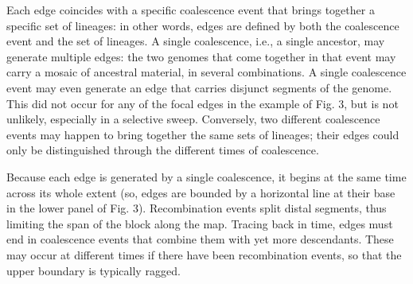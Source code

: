 \documentclass[twocolumn]{bmcart}%
\begin{document}
Each edge coincides with a specific coalescence event that brings together a specific set of lineages: in other words, edges are defined by both the coalescence event and the set of lineages. A single coalescence, i.e., a single ancestor, may generate multiple edges: the two genomes that come together in that event may carry a mosaic of ancestral material, in several combinations. A single coalescence event may even generate an edge that carries disjunct segments of the genome. This did not occur for any of the focal edges in the example of Fig. 3, but is not unlikely, especially in a selective sweep. Conversely, two different coalescence events may happen to bring together the same sets of lineages; their edges could only be distinguished through the different times of coalescence.

Because each edge is generated by a single coalescence, it begins at the same time across its whole extent (so, edges are bounded by a horizontal line at their base in the lower panel of Fig. 3). Recombination events split distal segments, thus limiting the span of the block along the map. Tracing back in time, edges must end in coalescence events that combine them with yet more descendants. These may occur at different times if there have been recombination events, so that the upper boundary is typically ragged.
\end{document}
